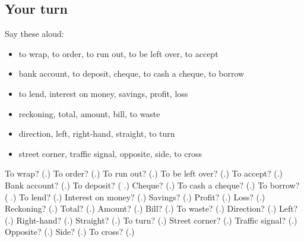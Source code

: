 \subsection*{Your turn}
Say these aloud:

\begin{itemize}
\raggedright
  \item to wrap, to order, to run out, to be left over, to accept
  \item bank account, to deposit, cheque, to cash a cheque, to borrow
  \item to lend, interest on money, savings, profit, loss
  \item reckoning, total, amount, bill, to waste
  \item direction, left, right-hand, straight, to turn
  \item street corner, traffic signal, opposite, side, to cross
\end{itemize}

\begin{tcolorbox}[breakable,colback=teal!4,colframe=teal!35!black,title={Before you move on}]
To wrap? (\textbf{}.) To order? (\textbf{}.) To run out? (\textbf{}.) To be left over? (\textbf{}.) To accept? (\textbf{}.) Bank account? (\textbf{}.) To deposit? (\textbf{ }.) Cheque? (\textbf{}.) To cash a cheque? (\textbf{}.) To borrow? (\textbf{ }.) To lend? (\textbf{}.) Interest on money? (\textbf{}.) Savings? (\textbf{}.) Profit? (\textbf{}.) Loss? (\textbf{}.) Reckoning? (\textbf{}.) Total? (\textbf{}.) Amount? (\textbf{}.) Bill? (\textbf{}.) To waste? (\textbf{}.) Direction? (\textbf{}.) Left? (\textbf{}.) Right-hand? (\textbf{}.) Straight? (\textbf{}.) To turn? (\textbf{}.) Street corner? (\textbf{}.) Traffic signal? (\textbf{}.) Opposite? (\textbf{}.) Side? (\textbf{}.) To cross? (\textbf{}.)
\end{tcolorbox}
